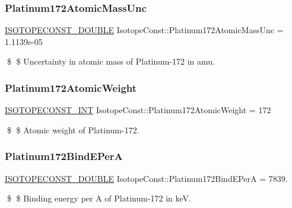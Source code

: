 \subsubsection{\texorpdfstring{Platinum172\+Atomic\+Mass\+Unc}{Platinum172AtomicMassUnc}}
{\footnotesize\ttfamily \mbox{\hyperlink{group___isotope_const-_macros_ga8f45a7272ce02c0b4c65c44636ed719a}{I\+S\+O\+T\+O\+P\+E\+C\+O\+N\+S\+T\+\_\+\+D\+O\+U\+B\+LE}} Isotope\+Const\+::\+Platinum172\+Atomic\+Mass\+Unc = 1.\+1139e-\/05}

\$ \$ Uncertainty in atomic mass of Platinum-\/172 in amu. \mbox{\label{group___isotope_const-_platinum-_pt172_gaed4cf0662a03d9cf213945681ecacc76}} 
\subsubsection{\texorpdfstring{Platinum172\+Atomic\+Weight}{Platinum172AtomicWeight}}
{\footnotesize\ttfamily \mbox{\hyperlink{group___isotope_const-_macros_ga5f18360b3e99483a35c32d789e62621c}{I\+S\+O\+T\+O\+P\+E\+C\+O\+N\+S\+T\+\_\+\+I\+NT}} Isotope\+Const\+::\+Platinum172\+Atomic\+Weight = 172}

\$ \$ Atomic weight of Platinum-\/172. \mbox{\label{group___isotope_const-_platinum-_pt172_gabb66197a231035a21333ea0fc3908568}} 
\subsubsection{\texorpdfstring{Platinum172\+Bind\+E\+PerA}{Platinum172BindEPerA}}
{\footnotesize\ttfamily \mbox{\hyperlink{group___isotope_const-_macros_ga8f45a7272ce02c0b4c65c44636ed719a}{I\+S\+O\+T\+O\+P\+E\+C\+O\+N\+S\+T\+\_\+\+D\+O\+U\+B\+LE}} Isotope\+Const\+::\+Platinum172\+Bind\+E\+PerA = 7839.}

\$ \$ Binding energy per A of Platinum-\/172 in keV. \mbox{\label{group___isotope_const-_platinum-_pt172_ga638e4faba7f3ed1296081eea40ed24b6}} 
